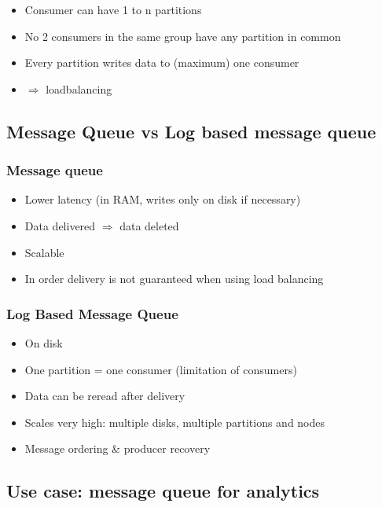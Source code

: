 \documentclass{article}
\begin{document}
\begin{itemize}
    \item Consumer can have 1 to n partitions
    \item No 2 consumers in the same group have any partition in common
    \item Every partition writes data to (maximum) one consumer
    \item $\Rightarrow$ loadbalancing 
\end{itemize}

\subsection{Message Queue vs Log based message queue}

\subsubsection{Message queue}

\begin{itemize}
    \item Lower latency (in RAM, writes only on disk if necessary)
    \item Data delivered $\Rightarrow$ data deleted
    \item Scalable
    \item In order delivery is not guaranteed when using load balancing
\end{itemize}

\subsubsection{Log Based Message Queue}

\begin{itemize}
    \item On disk
    \item One partition = one consumer (limitation of consumers)
    \item Data can be reread after delivery
    \item Scales very high: multiple disks, multiple partitions and nodes
    \item Message ordering \& producer recovery
\end{itemize}

\subsection{Use case: message queue for analytics}
\end{document}
